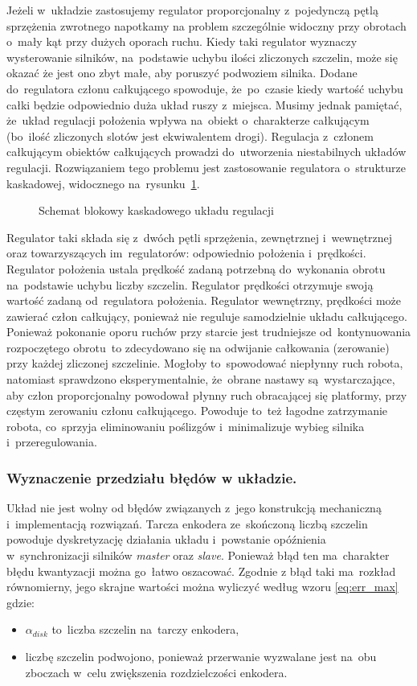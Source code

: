 \documentclass[11pt]{article}
\begin{document}
Jeżeli w~układzie zastosujemy regulator proporcjonalny z~pojedynczą pętlą sprzężenia zwrotnego napotkamy na problem szczególnie widoczny przy obrotach o~mały kąt przy dużych oporach ruchu.
Kiedy taki regulator wyznaczy wysterowanie silników, na~podstawie uchybu ilości zliczonych szczelin, może się okazać że jest ono zbyt małe, aby poruszyć podwoziem silnika.
Dodane do~regulatora członu całkującego spowoduje, że~po~czasie kiedy wartość uchybu całki będzie odpowiednio duża układ ruszy z~miejsca.
Musimy jednak pamiętać, że~układ regulacji położenia wpływa na~obiekt o~charakterze całkującym (bo~ilość zliczonych slotów jest ekwiwalentem drogi).
Regulacja z~członem całkującym obiektów całkujących prowadzi do~utworzenia niestabilnych układów regulacji.
Rozwiązaniem tego problemu jest zastosowanie regulatora o~strukturze kaskadowej, widocznego na~rysunku~\ref{fig:tikz:control_block_casc}.
\begin{figure}
	\centering
	
	\caption{Schemat blokowy kaskadowego układu regulacji}
	\label{fig:tikz:control_block_casc}
\end{figure}
Regulator taki składa się z~dwóch pętli sprzężenia, zewnętrznej i~wewnętrznej oraz towarzyszących im~regulatorów: odpowiednio położenia i~prędkości.
Regulator położenia ustala prędkość zadaną potrzebną do~wykonania obrotu na~podstawie uchybu liczby szczelin.
Regulator prędkości otrzymuje swoją wartość zadaną od~regulatora położenia.
Regulator wewnętrzny, prędkości może zawierać człon całkujący, ponieważ nie reguluje samodzielnie układu całkującego.
Ponieważ pokonanie oporu ruchów przy starcie jest trudniejsze od~kontynuowania rozpoczętego obrotu\cite{resnick_phys}~to zdecydowano się na odwijanie całkowania (zerowanie) przy każdej zliczonej szczelinie.
Mogłoby to~spowodować niepłynny ruch robota, natomiast sprawdzono eksperymentalnie, że~obrane nastawy są~wystarczające, aby człon proporcjonalny powodował płynny ruch obracającej się platformy, przy częstym zerowaniu członu całkującego.
Powoduje to~też łagodne zatrzymanie robota, co~sprzyja eliminowaniu poślizgów i~minimalizuje wybieg silnika i~przeregulowania.

\subsubsection{Wyznaczenie przedziału błędów w układzie.} \label{sec:err}
Układ nie jest wolny od błędów związanych z~jego konstrukcją mechaniczną i~implementacją rozwiązań.
Tarcza enkodera ze~skończoną liczbą szczelin powoduje dyskretyzację działania układu i~powstanie opóźnienia w~synchronizacji silników \textit{master} oraz \textit{slave}.
Ponieważ błąd ten ma~charakter błędu kwantyzacji można go~łatwo oszacować.
Zgodnie z \cite{Buch_measure} błąd taki ma~rozkład równomierny, jego skrajne wartości można wyliczyć według wzoru \ref{eq:err_max} gdzie:
\begin{itemize}
	\item $ \alpha_{disk} $ to~liczba szczelin na~tarczy enkodera, 
	\item liczbę szczelin podwojono, ponieważ przerwanie wyzwalane jest na~obu zboczach w~celu zwiększenia rozdzielczości enkodera.
\end{itemize}
\end{document}
